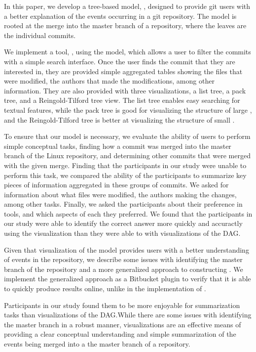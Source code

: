 In this paper, we develop a tree-based model, \mt, designed to provide git
users with a better explanation of the events occurring in a git
repository. The \mt model is rooted at the merge into the master branch
of a repository, where the leaves are the individual commits.

We implement a tool, \tool, using the \mt model, which allows a user to
filter the commits with a simple search interface. Once the user finds
the commit that they are interested in, they are provided simple
aggregated tables showing the files that were modified, the authors that
made the modifications, among other information. They are also provided
with three visualizations, a list tree, a pack tree, and a
Reingold-Tilford tree view. The list tree enables easy searching for
textual features, while the pack tree is good for visualizing the
structure of large , and the Reingold-Tilford tree is better
at visualizing the structure of small .

To ensure that our model is necessary, we evaluate the ability of users
to perform simple conceptual tasks, finding how a commit was merged into
the master branch of the Linux repository, and determining other commits
that were merged with the given merge. Finding that the participants in
our study were unable to perform this task, we compared the ability of
the participants to summarize key pieces of information aggregated in
these groups of commits. We asked for information about what files were
modified, the authors making the changes, among other tasks. Finally, we
asked the participants about their preference in tools, and which
aspects of each they preferred. We found that the participants in our
study were able to identify the correct answer more quickly and
accuractly using the \mt visualization than they were able to with
visualizations of the DAG.

Given that visualization of the model provides users with a better
understanding of events in the repository, we describe some issues with
identifying the master branch of the repository and a more generalized
approach to constructing . We implement the generalized approach
as a Bitbucket plugin to verify that it is able to quickly produce
results online, unlike in the implementation of \tool.

Participants in our study found them to be more enjoyable for
summarization tasks than visualizations of the DAG.\@ While there are
some issues with identifying the master branch in a robust manner, \mt
visualizations are an effective means of providing a clear conceptual
understanding and simple summarization of the events being merged into a
the master branch of a repository.
